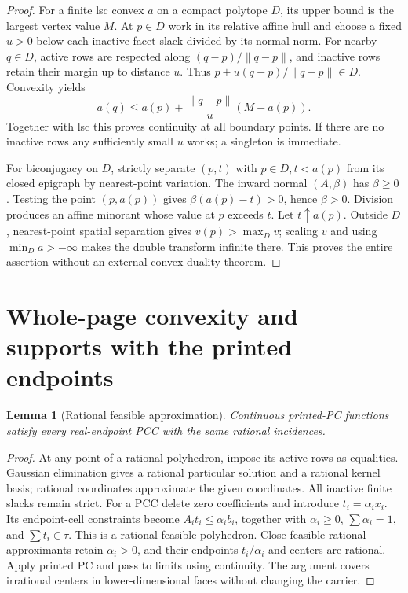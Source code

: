 \documentclass[11pt]{article}
\newtheorem{lemma}[theorem]{Lemma}
\begin{document}
\begin{proof}
For a finite lsc convex $a$ on a compact polytope $D$, its upper bound is the largest vertex value $M$. At $p\in D$ work in its relative affine hull and choose a fixed $u>0$ below each inactive facet slack divided by its normal norm. For nearby $q\in D$, active rows are respected along $(q-p)/\|q-p\|$, and inactive rows retain their margin up to distance $u$. Thus $p+u(q-p)/\|q-p\|\in D$. Convexity yields
\[
a(q)\leq a(p)+\frac{\|q-p\|}{u}(M-a(p)).
\]
Together with lsc this proves continuity at all boundary points. If there are no inactive rows any sufficiently small $u$ works; a singleton is immediate.

For biconjugacy on $D$, strictly separate $(p,t)$ with $p\in D,t<a(p)$ from its closed epigraph by nearest-point variation. The inward normal $(A,\beta)$ has $\beta\geq0$. Testing the point $(p,a(p))$ gives $\beta(a(p)-t)>0$, hence $\beta>0$. Division produces an affine minorant whose value at $p$ exceeds $t$. Let $t\uparrow a(p)$. Outside $D$, nearest-point spatial separation gives $v(p)>\max_D v$; scaling $v$ and using $\min_D a> -\infty$ makes the double transform infinite there. This proves the entire assertion without an external convex-duality theorem.
\end{proof}

\section{Whole-page convexity and supports with the printed endpoints}
\begin{lemma}[Rational feasible approximation]\label{lem:density}
Continuous printed-PC functions satisfy every real-endpoint PCC with the same rational incidences.
\end{lemma}
\begin{proof}
At any point of a rational polyhedron, impose its active rows as equalities. Gaussian elimination gives a rational particular solution and a rational kernel basis; rational coordinates approximate the given coordinates. All inactive finite slacks remain strict. For a PCC delete zero coefficients and introduce $t_i=\alpha_i x_i$. Its endpoint-cell constraints become $A_i t_i\leq\alpha_i b_i$, together with $\alpha_i\geq0$, $\sum\alpha_i=1$, and $\sum t_i\in\tau$. This is a rational feasible polyhedron. Close feasible rational approximants retain $\alpha_i>0$, and their endpoints $t_i/\alpha_i$ and centers are rational. Apply printed PC and pass to limits using continuity. The argument covers irrational centers in lower-dimensional faces without changing the carrier.
\end{proof}
\end{document}
